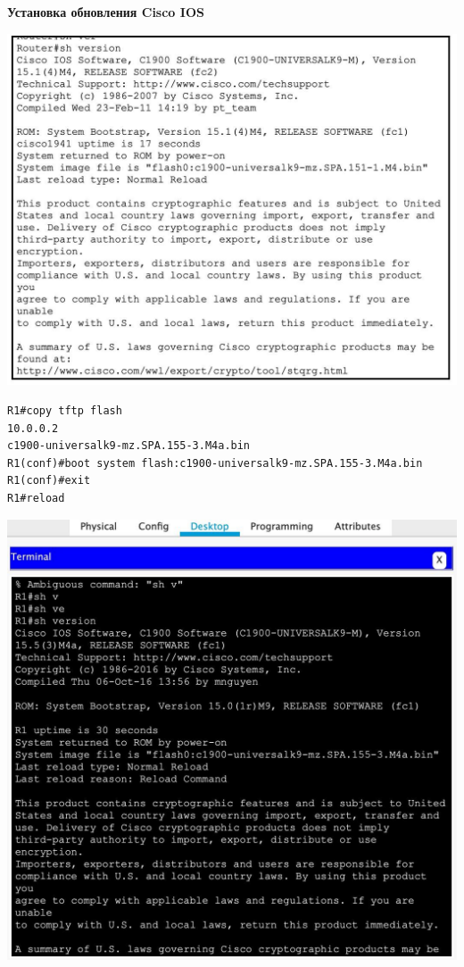\documentclass[a4paper,14pt]{extarticle}
\begin{document}
    \begin{center}
        \textbf{Установка обновления Cisco IOS}
    \end{center}
    \begin{center}
        \includegraphics[scale=0.34]{pics/0.jpeg}
    \end{center}
    \begin{lstlisting}
R1#copy tftp flash
10.0.0.2
c1900-universalk9-mz.SPA.155-3.M4a.bin
R1(conf)#boot system flash:c1900-universalk9-mz.SPA.155-3.M4a.bin
R1(conf)#exit
R1#reload
    \end{lstlisting}
    \begin{center}
        \includegraphics[scale=0.34]{pics/1.jpeg}
    \end{center}
\end{document}
